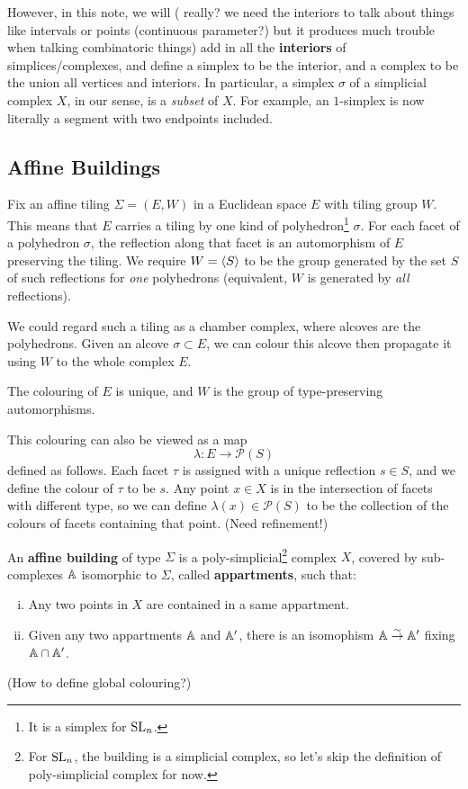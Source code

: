 \documentclass{article}
\begin{document}
However, in this note, we will ({\color{red} really? we need the interiors to talk about things like intervals or points (continuous parameter?) but it produces much trouble when talking combinatoric things}) add in all the \textbf{interiors} of simplices/complexes,
and define a simplex to be the interior, and a complex to be the union all vertices and interiors. In particular, a simplex $\sigma$ of a simplicial complex $X$, in our sense, is a \textit{subset} of $X$.
For example, an $1$-simplex is now literally a segment with two endpoints included.

\subsection{Affine Buildings}

Fix an affine tiling $\Sigma = (E, W)$ in a Euclidean space $E$ with tiling group $W$.
This means that $E$ carries a tiling by one kind of polyhedron\footnote{
    It is a simplex for $\operatorname{SL}_n$.
} $\sigma$.
For each facet of a polyhedron $\sigma$,
the reflection along that facet is an automorphism of $E$ preserving the tiling.
We require $W = \left\langle S \right\rangle$ to be the group generated by the set $S$ of such reflections for \textit{one} polyhedrons (equivalent, $W$ is generated by \textit{all} reflections).

We could regard such a tiling as a chamber complex,
where alcoves are the polyhedrons.
Given an alcove $\sigma\subset E$,
we can colour this alcove then propagate it using $W$ to the whole complex $E$.
\begin{lemma}\label{unicity of colouring on appartments}
    The colouring of $E$ is unique,
    and $W$ is the group of type-preserving automorphisms.
\end{lemma}
This colouring can also be viewed as a map \[\lambda : E\to \mathcal{P}(S)\]
defined as follows. Each facet $\tau$ is assigned with a unique reflection $s\in S$, and we define the colour of $\tau$ to be $s$.
Any point $x\in X$ is in the intersection of facets with different type,
so we can define $\lambda(x)\in\mathcal{P}(S)$
to be the collection of the colours of facets containing that point.
(Need refinement!)

An \textbf{affine building} of type $\Sigma$ is a poly-simplicial\footnote{
    For $\operatorname{SL}_n$, the building is a simplicial complex, so let's skip the definition of poly-simplicial complex for now.
} complex $X$,
covered by sub-complexes $\mathbb{A}$ isomorphic to $\Sigma$, called \textbf{appartments}, such that:\begin{enumerate}[(i)]
    \item Any two points in $X$ are contained in a same appartment.
    \item Given any two appartments $\mathbb{A}$ and $\mathbb{A}'$, there is an isomophism $\mathbb{A}\stackrel{\sim}{\rightarrow} \mathbb{A}'$ fixing $\mathbb{A}\cap\mathbb{A}'$. 
\end{enumerate}
(How to define global colouring?)
\end{document}
